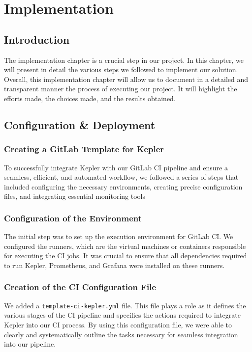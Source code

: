 \chapter{Implementation}
\label{chap:Chapter 4 title}
\section{Introduction}

The implementation chapter is a crucial step in our project. In this chapter, we will present in detail the various steps we followed to implement our solution. Overall, this implementation chapter will allow us to document in a detailed and transparent manner the process of executing our project. It will highlight the efforts made, the choices made, and the results obtained.

\pagebreak

\section{Configuration \& Deployment}
\subsection{Creating a GitLab Template for Kepler}

To successfully integrate Kepler with our GitLab CI pipeline and ensure a seamless, efficient, and automated workflow, we followed a series of steps that included configuring the necessary environments, creating precise configuration files, and integrating essential monitoring tools
\subsection*{Configuration of the Environment}

The initial step was to set up the execution environment for GitLab CI. We configured the runners, which are the virtual machines or containers responsible for executing the CI jobs. It was crucial to ensure that all dependencies required to run Kepler, Prometheus, and Grafana were installed on these runners.

\subsection*{Creation of the CI Configuration File}

We added a \texttt{template-ci-kepler.yml} file. This file plays a 
role as it defines the various stages of the CI pipeline and specifies the actions required to integrate Kepler into our CI process. By using this configuration file, we were able to clearly and systematically outline the tasks necessary for seamless integration into our pipeline.

